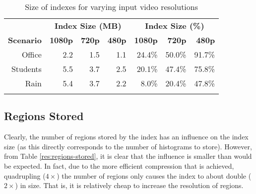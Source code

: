 \begin{table}[t]
    \caption{Size of indexes for varying input video resolutions}\label{res:resolution-space}
	\centering
    \begin{tabular}{ r rrr rrr }
		~ & \multicolumn{3}{c|}{\textbf{Index Size (MB)}} & \multicolumn{3}{c}{\textbf{Index Size (\%)}} \\
		\cline{2-7}
	    \textbf{Scenario} & \textbf{1080p} & \textbf{720p} & \textbf{480p} & \textbf{1080p} & \textbf{720p} & \textbf{480p} \\ \hline\noalign{\smallskip}
		Office   		& 2.2 & 1.5 & 1.1 		& 24.4\% & 50.0\% & 91.7\%        \\
	    Students		& 5.5 & 3.7 & 2.5 		& 20.1\% & 47.4\% & 75.8\%        \\
	    Rain     		& 5.4 & 3.7 & 2.2 		&  8.0\% & 20.4\% & 47.8\%        \\\noalign{\smallskip}
        \hline
	   \end{tabular}
\end{table}


\subsection{Regions Stored}
Clearly, the number of regions stored by the index has an influence on the index size (as this directly corresponds to the number of histograms to store). However, from Table \ref{res:regions-stored}, it is clear that the influence is smaller than would be expected. In fact, due to the more efficient compression that is achieved, quadrupling ($4\times$) the number of regions only causes the index to about double ($2\times$) in size. That is, it is relatively cheap to increase the resolution of regions. 


